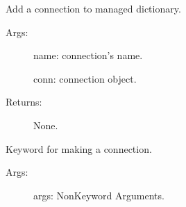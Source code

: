\documentclass[letterpaper,10pt,english]{sphinxmanual}
\begin{document}
\begin{fulllineitems}

\begin{fulllineitems}
\label{\detokenize{QConnectionLibrary:QConnectionLibrary.connection_manager.ConnectionManager.ROBOT_LIBRARY_SCOPE}}
\end{fulllineitems}


\begin{fulllineitems}
\label{\detokenize{QConnectionLibrary:QConnectionLibrary.connection_manager.ConnectionManager.add_connection}}
\sphinxAtStartPar
Add a connection to managed dictionary.
\begin{description}
\item[{Args:}] \leavevmode
\sphinxAtStartPar
name: connection’s name.

\sphinxAtStartPar
conn: connection object.

\item[{Returns:}] \leavevmode
\sphinxAtStartPar
None.

\end{description}

\end{fulllineitems}


\begin{fulllineitems}
\label{\detokenize{QConnectionLibrary:QConnectionLibrary.connection_manager.ConnectionManager.connect}}
\sphinxAtStartPar
Keyword for making a connection.
\begin{description}
\item[{Args:}] \leavevmode
\sphinxAtStartPar
args:   Non\sphinxhyphen{}Keyword Arguments.


\end{description}
\end{fulllineitems}
\end{fulllineitems}
\end{document}
